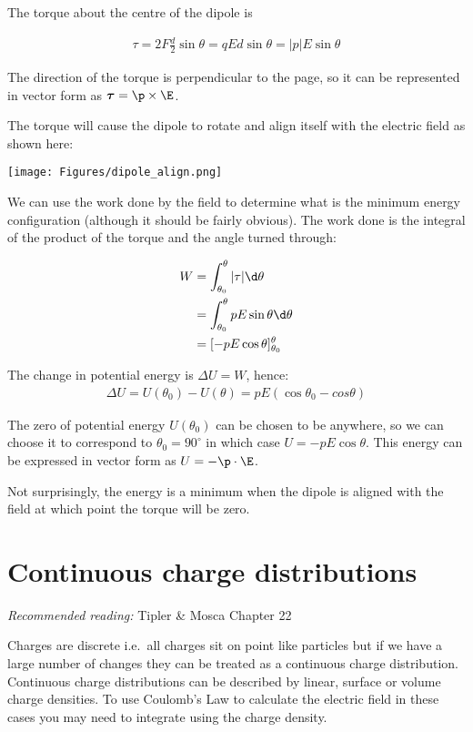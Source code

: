\documentclass[
]{book}
\theoremstyle{definition}
\theoremstyle{definition}
\theoremstyle{definition}
\theoremstyle{definition}
\theoremstyle{remark}
\begin{document}
The torque about the centre of the dipole is

\[\begin{aligned}
\tau = 2 F \frac{d}{2} \sin\theta = q E d \sin\theta = |p|E \sin\theta
\end{aligned}\]

The direction of the torque is perpendicular to the page, so it can be
represented in vector form as \(\boldsymbol{\tau} = \p \times \E\).

The torque will cause the dipole to rotate and align itself with the
electric field as shown here:

\texttt{[image: Figures/dipole\_align.png]} \protect\hypertarget{fig:diAlign}{}{}

We can use the work done by the field to determine what is the minimum
energy configuration (although it should be fairly obvious). The work
done is the integral of the product of the torque and the angle turned
through:

\[\begin{aligned}
W &= \int_{\theta_0}^{\theta} |\tau| \d\theta \\
&= \int_{\theta_0}^{\theta} pE \sin\theta \d\theta \\ 
&= [-pE \cos\theta]_{\theta_0}^{\theta}
\end{aligned}\]

The change in potential energy is \(\Delta U = W\), hence:
\[\begin{aligned}
\Delta U = U(\theta_0) - U(\theta) = pE(\cos⁡\theta_0 - cos\theta)
\end{aligned}\]

The zero of potential energy \(U(\theta_0)\) can be chosen to be anywhere,
so we can choose it to correspond to \(\theta_0 = 90^{\circ}\) in which
case \(U = -pE \cos\theta\). This energy can be expressed in vector form
as \(U = - \p \cdot \E\).

Not surprisingly, the energy is a minimum when the dipole is aligned
with the field at which point the torque will be zero.

\hypertarget{continuous-charge-distributions}{%
\section{Continuous charge distributions}\label{continuous-charge-distributions}}

\emph{Recommended reading:} Tipler \& Mosca Chapter 22

Charges are discrete i.e.~all charges sit on point like particles but if
we have a large number of changes they can be treated as a continuous
charge distribution. Continuous charge distributions can be described by
linear, surface or volume charge densities. To use Coulomb's Law to
calculate the electric field in these cases you may need to integrate
using the charge density.
\end{document}
